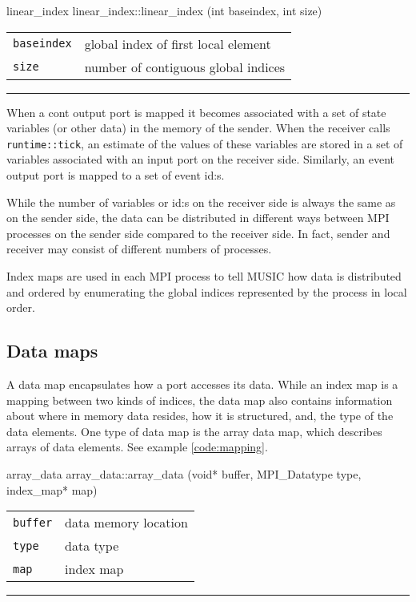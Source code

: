 \documentclass[a4paper]{report}
\makeatletter
\newenvironment{parameters}%
{\begin{tabular}{@{\hspace{2em}}lp{0.6\textwidth}}}%
{\end{tabular}\par\vspace{1mm}\par\hrule\par\vspace{5mm}}
\makeatother
\begin{document}
\begin{head}{linear_index}
  linear_index::linear_index (int baseindex, int size)
\end{head}
\begin{parameters}
  \lstinline|baseindex| & global index of first local element \\
  \lstinline|size| & number of contiguous global indices \\
\end{parameters}

When a cont output port is mapped it becomes associated with a set of
state variables (or other data) in the memory of the sender.  When the
receiver calls \lstinline|runtime::tick|, an estimate of the values
of these variables are stored in a set of variables associated with an
input port on the receiver side.  Similarly, an event output port is
mapped to a set of event id:s.

While the number of variables or id:s on the receiver side is always
the same as on the sender side, the data can be distributed in
different ways between MPI processes on the sender side compared to
the receiver side.  In fact, sender and receiver may consist of
different numbers of processes.

Index maps are used in each MPI process to tell MUSIC how data is
distributed and ordered by enumerating the global indices represented
by the process in local order.

\subsection{Data maps}
\label{sec:datamap}

A data map encapsulates how a port accesses its data.  While an index
map is a mapping between two kinds of indices, the data map also
contains information about where in memory data resides, how it is
structured, and, the type of the data elements.  One type of data map
is the array data map, which describes arrays of data elements.
See example \ref{code:mapping}.

\begin{head}{array_data}
  array_data::array_data (void* buffer, MPI_Datatype type,
                          index_map* map)
\end{head}
\begin{parameters}
  \lstinline|buffer| & data memory location \\
  \lstinline|type|   & data type \\
  \lstinline|map|    & index map \\
\end{parameters}
\end{document}
